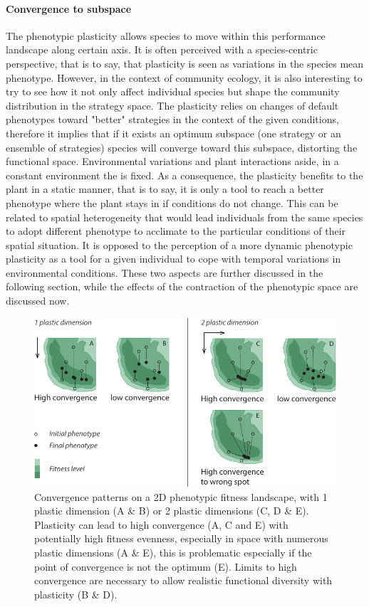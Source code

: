 \paragraph{Convergence to subspace}

The phenotypic plasticity allows species to move within this performance landscape along certain axis. It is often perceived with a species-centric perspective, that is to say, that plasticity is seen as variations in the species mean phenotype. However, in the context of community ecology, it is also interesting to try to see how it not only affect individual species but shape the community distribution in the strategy space. The plasticity relies on changes of default phenotypes toward "better" strategies in the context of the given conditions, therefore it implies that if it exists an optimum subspace (one strategy or an ensemble of strategies) species will converge toward this subspace, distorting the functional space. Environmental variations and plant interactions aside, in a constant environment the  is fixed. As a consequence, the plasticity benefits to the plant in a static manner, that is to say, it is only a tool to reach a better phenotype where the plant stays in if conditions do not change. This can be related to spatial heterogeneity that would lead individuals from the same species to adopt different phenotype to acclimate to the particular conditions of their spatial situation. It is opposed to the perception of a more dynamic phenotypic plasticity as a tool for a given individual to cope with temporal variations in environmental conditions. These two aspects are further discussed in the following section, while the effects of the contraction of the phenotypic space are discussed now.

\begin{figure}\label{fig:convergence}
\includegraphics[width = \textwidth]{./2_PP/Figures/Landscape/ld_convergence.pdf}
\caption[Convergence patterns]{Convergence patterns on a 2D phenotypic fitness landscape, with 1 plastic dimension (A \& B) or 2 plastic dimensions (C, D \& E). Plasticity can lead to high convergence (A, C and E) with potentially high fitness evenness, especially in space with numerous plastic dimensions (A \& E), this is problematic especially if the point of convergence is not the optimum (E). Limits to high convergence are necessary to allow realistic functional diversity with plasticity (B \& D).}
\end{figure}

